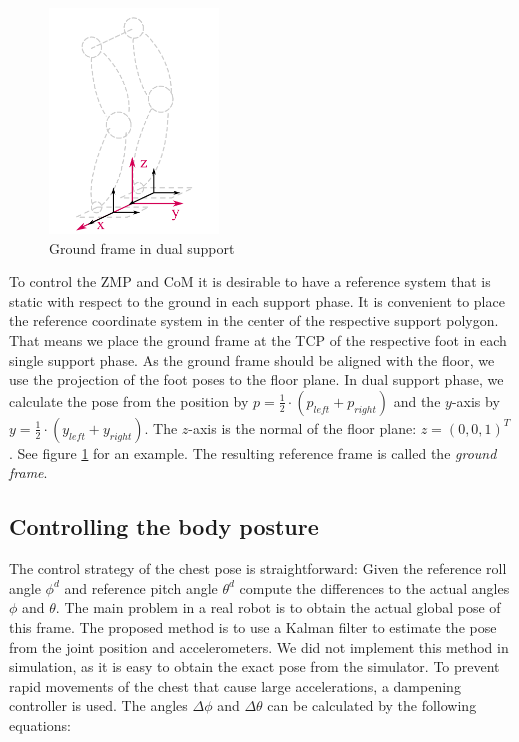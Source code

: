 \documentclass[english,ngerman]{KITreprt}
\begin{document}
\begin{figure}
\vspace*{-1em}
\includegraphics[width=0.4\textwidth]{images/ground_frame.png}
\caption{Ground frame in dual support}
\label{img:ground-frame}
\end{figure}

To control the ZMP and CoM it is desirable to have a reference system
that is static with respect to the ground in each support phase. It is
convenient to place the reference coordinate system in the center of the
respective support polygon. That means we place the ground frame at the
TCP of the respective foot in each single support phase. As the ground
frame should be aligned with the floor, we use the projection of the
foot poses to the floor plane. In dual support phase, we calculate the
pose from the position by $p = \frac{1}{2} \cdot (p_{left} + p_{right})$
and the $y$-axis by $y = \frac{1}{2} \cdot (y_{left} + y_{right})$. The
$z$-axis is the normal of the floor plane: $z = (0, 0, 1)^T$. See figure
\ref{img:ground-frame} for an example. The resulting reference frame is
called the \emph{ground frame}.

\subsection{Controlling the body
posture}\label{controlling-the-body-posture}

The control strategy of the chest pose is straightforward: Given the
reference roll angle $\phi^d$ and reference pitch angle $\theta^d$
compute the differences to the actual angles $\phi$ and $\theta$. The
main problem in a real robot is to obtain the actual global pose of this
frame. The proposed method is to use a Kalman filter to estimate the
pose from the joint position and accelerometers. We did not implement
this method in simulation, as it is easy to obtain the exact pose from
the simulator. To prevent rapid movements of the chest that cause large
accelerations, a dampening controller is used. The angles $\Delta \phi$
and $\Delta \theta$ can be calculated by the following equations:
\end{document}
